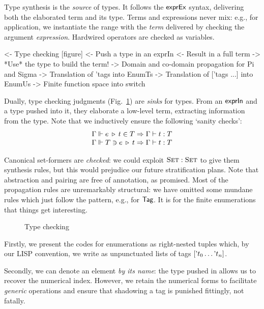 Type synthesis is the \emph{source} of types. It follows the \(\textsf{exprEx}\)
syntax, delivering both the elaborated term and its type. Terms
and expressions never mix: e.g., for application, we
instantiate the range with the \emph{term} delivered by checking the
argument \emph{expression}. Hardwired operators are checked as variables.


%



\begin{wstructure}
<- Type checking [figure]
    <- Push a type in an exprIn
    <- Result in a full term
    -> *Use* the type to build the term!
        -> Domain and co-domain propagation for Pi and Sigma
        -> Translation of 'tags into EnumTs
        -> Translation of ['tags ...] into EnumUs
        -> Finite function space into switch
\end{wstructure}

Dually, type checking judgments
(Fig.~\ref{fig:type-checking}) are \emph{sinks} for types. From an
$\textsf{exprIn}$ and a type pushed into it, they elaborate a low-level
term, extracting information from the type. Note that we inductively ensure the following `sanity checks':
%
\[\stkc{
\Gamma\Vdash\propag{e}{\pull{t}{T}} \Rightarrow
  \Gamma\vdash t:T \\
\Gamma\Vdash\push{\propag{e}{t}}{T} \Rightarrow
  \Gamma\vdash t:T
}\]

Canonical set-formers are \emph{checked}: we could exploit
\(\Set:\Set\) to give them synthesis rules, but this would prejudice
our future stratification plans. Note that abstraction and pairing are
free of annotation, as promised. Most of the propagation rules are
unremarkably structural: we have omitted some mundane rules which just
follow the pattern, e.g., for \(\UId\). It is for the finite
enumerations that things get interesting.

\begin{figure}

\caption{Type checking}
\label{fig:type-checking}
\end{figure}

Firstly, we present the codes for enumerations as right-nested tuples
which, by our LISP convention, we write as unpunctuated lists of tags
\(\sqr{\etag{t_0}\ldots\etag{t_n}}\).

Secondly, we can denote an element \emph{by its
name}: the type pushed in allows us to recover the numerical
index. However, we retain the numerical forms to facilitate
\emph{generic} operations and ensure that shadowing a tag is punished
fittingly, not fatally.

